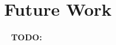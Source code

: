 \documentclass[11pt,a4paper]{article}
\begin{document}



\section{Future Work}\label{future}



\begin{comment}


- initialized weight matrix based on label co-occurrence
\citet{kurata-etal-2016-improved} proposed a novel neural network initialization method to
treat some of the neurons in the final hidden layer as dedicated neurons for each pattern of label
co-occurrence These dedicated neurons are initialized to connect to the corresponding co-occurring
labels with stronger weights than to others.

- %
When the labels form a hierarchy, they share a hypernym–hyponym relation. When multiple
 labels are assigned to the text, if it is explicitly labeled by a subclass it must also implicitly
 include all of the its super- classes.
The co-occurrence between subclasses and superclasses as labels for the input text contains
information we would like to leverage to improve multi-label classification using a neural network.

- use a proper corpus with embeddings as well for n-grams

- %




\end{comment}


\ \newline
\textbf{TODO:}
\ \newline

\begin{comment}
\section*{Acknowledgments}
\ \newline
\end{comment}



\end{document}
